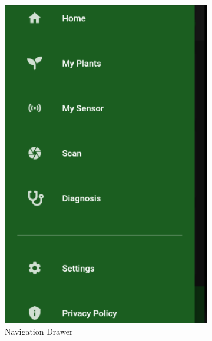 \documentclass[a4paper,12pt]{report}
\begin{document}
\begin{figure}[H]
	
	\begin{subfigure}{0.3\textwidth}
		\includegraphics[width=\textwidth]{./images/navigation_drawer/navigation_drawer.png}
		\caption{Navigation Drawer}
		\label{fig:navigation_drawer}
	\end{subfigure}
	\hfill
	\begin{subfigure}{0.3\textwidth}

\end{subfigure}
\end{figure}
\end{document}

